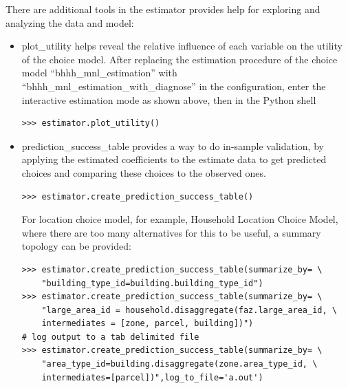 There are additional tools in the estimator provides help
for exploring and analyzing the data and model:
\begin{itemize}
\item plot_utility helps reveal the relative influence of
  each variable on the utility of the choice model. After
  replacing the estimation procedure of the choice model
  ``bhhh_mnl_estimation'' with
  ``bhhh_mnl_estimation_with_diagnose'' in the
  configuration, enter the interactive estimation mode as
  shown above, then in the Python shell
\begin{verbatim}
>>> estimator.plot_utility()
\end{verbatim}
\item prediction_success_table provides a way to do
  in-sample validation, by applying the estimated
  coefficients to the estimate data to get predicted choices
  and comparing these choices to the observed ones.
\begin{verbatim}
>>> estimator.create_prediction_success_table()
\end{verbatim}
  For location choice model, for example, Household Location
  Choice Model, where there are too many alternatives for
  this to be useful, a summary topology can be provided:
\begin{verbatim}
>>> estimator.create_prediction_success_table(summarize_by= \
    "building_type_id=building.building_type_id")
>>> estimator.create_prediction_success_table(summarize_by= \
    "large_area_id = household.disaggregate(faz.large_area_id, \
    intermediates = [zone, parcel, building])")
# log output to a tab delimited file
>>> estimator.create_prediction_success_table(summarize_by= \
    "area_type_id=building.disaggregate(zone.area_type_id, \
    intermediates=[parcel])",log_to_file='a.out')
\end{verbatim}

\end{itemize}